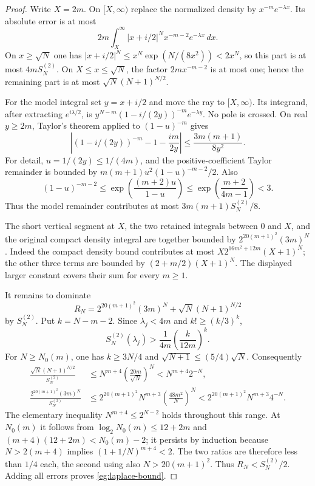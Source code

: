 \begin{proof}
Write $X=2m$.  On $[X,\infty)$ replace the normalized density
by $x^{-m}e^{-\lambda x}$.  Its absolute error is at most
\[
 2m\int_X^\infty |x+i/2|^Nx^{-m-2}e^{-\lambda x}\,dx.
\]
On $x\ge\sqrt N$ one has
$|x+i/2|^N\le x^N\exp(N/(8x^2))<2x^N$, so this part is
at most $4mS_N^{(2)}$.  On $X\le x\le\sqrt N$, the factor
$2mx^{-m-2}$ is at most one; hence the remaining part is at most
$\sqrt N(N+1)^{N/2}$.

For the model integral set $y=x+i/2$ and move the ray to
$[X,\infty)$.  Its integrand, after extracting $e^{i\lambda/2}$,
is $y^{N-m}(1-i/(2y))^{-m}e^{-\lambda y}$.  No pole is crossed.
On real $y\ge2m$, Taylor's theorem applied to $(1-u)^{-m}$ gives
\[
 \left|(1-i/(2y))^{-m}-1-\frac{im}{2y}\right|
       \le\frac{3m(m+1)}{8y^2}.
\]
For detail, $u=1/(2y)\le1/(4m)$, and the positive-coefficient
Taylor remainder is bounded by
$m(m+1)u^2(1-u)^{-m-2}/2$.  Also
\[
 (1-u)^{-m-2}\le
  \exp\!\left(\frac{(m+2)u}{1-u}\right)
  \le\exp\!\left(\frac{m+2}{4m-1}\right)<3.
\]
Thus the model remainder contributes at most
$3m(m+1)S_N^{(2)}/8$.

The short vertical segment at $X$, the two retained integrals
between $0$ and $X$, and the original compact density integral
are together bounded by $2^{20(m+1)^2}(3m)^N$.  Indeed the
compact density bound contributes at most
$X2^{16m^2+12m}(X+1)^N$; the other three terms are bounded
by $(2+m/2)(X+1)^N$.  The displayed larger constant covers their
sum for every $m\ge1$.

It remains to dominate
\[
 R_N=2^{20(m+1)^2}(3m)^N+\sqrt N(N+1)^{N/2}
\]
by $S_N^{(2)}$.  Put $k=N-m-2$.  Since $\lambda_j<4m$ and
$k!\ge(k/3)^k$,
\[
 S_N^{(2)}(\lambda_j)>
             \frac1{4m}\left(\frac{k}{12m}\right)^k.
\]
For $N\ge N_0(m)$, one has $k\ge3N/4$ and
$\sqrt{N+1}\le(5/4)\sqrt N$.  Consequently
\begin{align*}
 \frac{\sqrt N(N+1)^{N/2}}{S_N^{(2)}}
  &\le N^{m+4}\left(\frac{20m}{\sqrt N}\right)^N
    <N^{m+4}2^{-N},\\
 \frac{2^{20(m+1)^2}(3m)^N}{S_N^{(2)}}
  &\le2^{20(m+1)^2}N^{m+3}
                \left(\frac{48m^2}{N}\right)^N
    <2^{20(m+1)^2}N^{m+3}4^{-N}.
\end{align*}
The elementary inequality $N^{m+4}\le2^{N-2}$ holds throughout
this range.  At $N_0(m)$ it follows from
$\log_2N_0(m)\le12+2m$ and
$(m+4)(12+2m)<N_0(m)-2$; it persists by induction because
$N>2(m+4)$ implies $(1+1/N)^{m+4}<2$.
The two ratios are therefore less than $1/4$ each, the second
using also $N>20(m+1)^2$.  Thus $R_N<S_N^{(2)}/2$.
Adding all errors proves \eqref{eg:laplace-bound}.
\end{proof}

